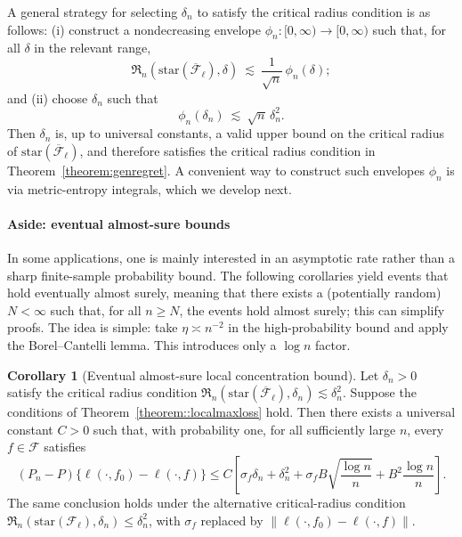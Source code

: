 \documentclass[11pt]{article}
\theoremstyle{plain}
\theoremstyle{definition} %
\newtheorem{corollary}{Corollary}
\begin{document}
 A general strategy for selecting $\delta_n$ to satisfy the critical radius condition is as follows:
(i) construct a nondecreasing envelope $\phi_n:[0,\infty)\to[0,\infty)$ such that, for all $\delta$ in the relevant range,
\begin{equation}
\label{eqn::env}
\mathfrak{R}_n\left(\mathrm{star}(\overline{\mathcal{F}}_{\ell}),\delta\right)
\ \lesssim\ 
\frac{1}{\sqrt{n}}\,\phi_n(\delta);
\end{equation}
and (ii) choose $\delta_n$ such that
\[
\phi_n(\delta_n) \ \lesssim\ \sqrt{n}\,\delta_n^2.
\]
Then $\delta_n$ is, up to universal constants, a valid upper bound on the critical radius of
$\mathrm{star}(\overline{\mathcal{F}}_{\ell})$, and therefore satisfies the critical radius condition in
Theorem~\ref{theorem:genregret}. A convenient way to construct such envelopes $\phi_n$ is via metric-entropy
integrals, which we develop next.



\paragraph{Aside: eventual almost-sure bounds}

In some applications, one is mainly interested in an asymptotic rate rather than a sharp finite-sample probability bound. The following corollaries yield events that hold eventually almost surely, meaning that there exists a (potentially random) \(N<\infty\) such that, for all \(n\ge N\), the events hold almost surely; this can simplify proofs. The idea is simple: take \(\eta \asymp n^{-2}\) in the high-probability bound and apply the Borel--Cantelli lemma. This introduces only a \(\log n\) factor.

\begin{corollary}[Eventual almost-sure local concentration bound]
\label{cor::localmaxloss_as}
Let \(\delta_n>0\) satisfy the critical radius condition
\(\mathfrak{R}_n(\mathrm{star}(\overline{\mathcal{F}}_{\ell}),\delta_n)\lesssim \delta_n^2\). Suppose the conditions of Theorem~\ref{theorem::localmaxloss} hold. Then there exists a universal constant \(C>0\) such that, with probability one, for all sufficiently large \(n\), every \(f\in\mathcal F\) satisfies
\[
(P_n-P)\{\ell(\cdot,f_0)-\ell(\cdot,f)\}
\le
C\left[
\sigma_f\delta_n
+
\delta_n^2
+
\sigma_f B\sqrt{\frac{\log n}{n}}
+
B^2\frac{\log n}{n}
\right].
\]
The same conclusion holds under the alternative critical-radius condition
\(\mathfrak{R}_n(\mathrm{star}(\mathcal{F}_{\ell}),\delta_n)\le \delta_n^2\), with
\(\sigma_f\) replaced by \(\|\ell(\cdot,f_0)-\ell(\cdot,f)\|\).
\end{corollary}
\end{document}
